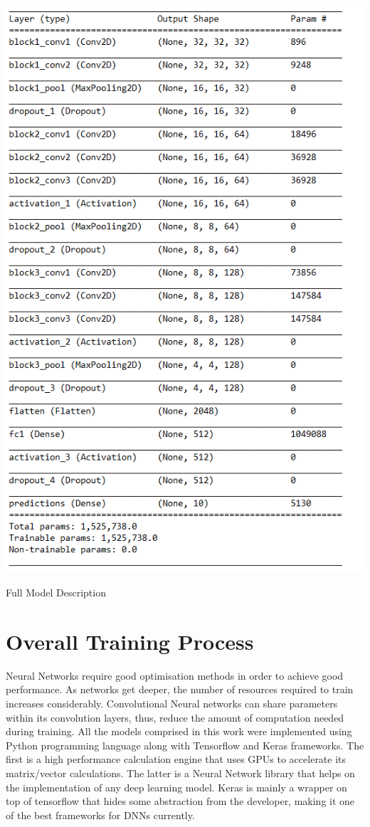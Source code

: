 \begin{table}[!h]
	\centering
	\includegraphics[scale=0.9]{vgg_arch.png}
	\caption{Full Model Description}
	\label{tbl:vgg10}
\end{table}
 
\section{Overall Training Process}

Neural Networks require good optimisation methods in order to achieve good performance. As networks get deeper, the number of resources required to train increases considerably. Convolutional Neural networks  can share parameters within its convolution layers, thus, reduce the amount of computation needed during training. All the models comprised in this work were implemented using Python programming language along with Tensorflow and Keras frameworks. The first is a high performance calculation engine that uses GPUs to accelerate its matrix/vector calculations. The latter is a Neural Network library that helps on the implementation of any deep learning model. Keras is mainly a wrapper on top of tensorflow that hides some abstraction from the developer, making it one of the best frameworks for DNNs currently.

